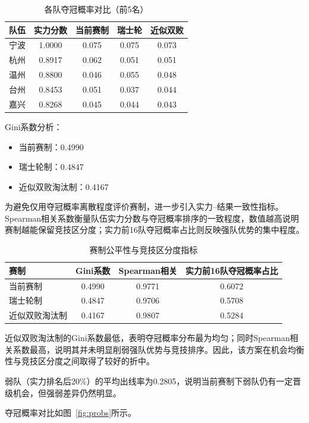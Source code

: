 \documentclass[a4paper,12pt]{article}
\begin{document}
\begin{table}[H]
\centering
\caption{各队夺冠概率对比（前5名）}
\label{tab:probs}
\begin{tabular}{lcccc}
\toprule
队伍 & 实力分数 & 当前赛制 & 瑞士轮 & 近似双败 \\
\midrule
宁波 & 1.0000 & 0.075 & 0.075 & 0.073 \\
杭州 & 0.8917 & 0.062 & 0.051 & 0.051 \\
温州 & 0.8800 & 0.046 & 0.055 & 0.048 \\
台州 & 0.8453 & 0.051 & 0.037 & 0.044 \\
嘉兴 & 0.8268 & 0.045 & 0.044 & 0.043 \\
\bottomrule
\end{tabular}
\end{table}

Gini系数分析：
\begin{itemize}
    \item 当前赛制：0.4990
    \item 瑞士轮制：0.4847
    \item 近似双败淘汰制：0.4167
\end{itemize}

为避免仅用夺冠概率离散程度评价赛制，进一步引入实力--结果一致性指标。Spearman相关系数衡量队伍实力分数与夺冠概率排序的一致程度，数值越高说明赛制越能保留竞技区分度；实力前16队夺冠概率占比则反映强队优势的集中程度。

\begin{table}[H]
\centering
\caption{赛制公平性与竞技区分度指标}
\label{tab:format_metrics}
\begin{tabular}{lccc}
\toprule
赛制 & Gini系数 & Spearman相关 & 实力前16队夺冠概率占比 \\
\midrule
当前赛制 & 0.4990 & 0.9771 & 0.6072 \\
瑞士轮制 & 0.4847 & 0.9706 & 0.5708 \\
近似双败淘汰制 & 0.4167 & 0.9807 & 0.5284 \\
\bottomrule
\end{tabular}
\end{table}

近似双败淘汰制的Gini系数最低，表明夺冠概率分布最为均匀；同时Spearman相关系数最高，说明其并未明显削弱强队优势与竞技排序。因此，该方案在机会均衡性与竞技区分度之间取得了较好的折中。

弱队（实力排名后20\%）的平均出线率为0.2805，说明当前赛制下弱队仍有一定晋级机会，但强弱差异仍然明显。

夺冠概率对比如图~\ref{fig:probs}所示。
\end{document}
